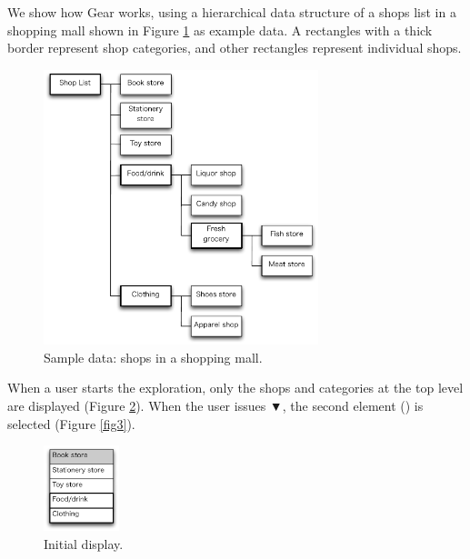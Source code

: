 \documentclass{article}
\def\down{▼}
\begin{document}
We show how Gear works, using a hierarchical data structure of
a shops list in a shopping mall shown in Figure \ref{fig1} as example data.
A rectangles with a thick border represent shop categories, and
other rectangles represent individual shops.

\begin{figure}[H]
\centerline{\includegraphics[width=80mm,bb=0 0 490 490]{figures/fig1.pdf}}
\caption{Sample data: shops in a shopping mall.}
\label{fig1}
\end{figure}

When a user starts the exploration, only the shops and categories
at the top level are displayed (Figure \ref{fig2}).
When the user issues {\down},
the second element () is selected (Figure \ref{fig3}).

\def\menuwidth{22mm}

\begin{figure}[H]
\centerline{\includegraphics[width=\menuwidth, bb=0 0 139 157]{figures/fig2.pdf}}
\caption{Initial display.}
\label{fig2}
\end{figure}
\end{document}

